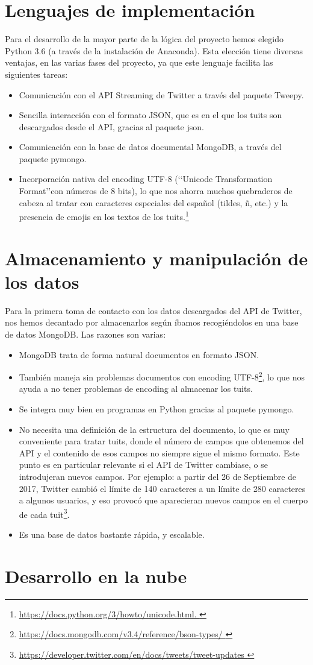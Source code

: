 \section{Lenguajes de implementación}

Para el desarrollo de la mayor parte de la lógica del proyecto hemos elegido Python 3.6 (a través de la
instalación de Anaconda). Esta elección tiene diversas ventajas, en las varias fases del proyecto, ya
que este lenguaje facilita las siguientes tareas:
\begin{itemize}
\item Comunicación con el API Streaming de Twitter a través del paquete Tweepy.
\item Sencilla interacción con el formato JSON, que es en el que los tuits son descargados desde el API, gracias al paquete json.
\item  Comunicación con la base de datos documental MongoDB, a través del paquete pymongo.
\item Incorporación nativa del encoding UTF-8 (\lq\lq Unicode Transformation Format\rq\rq con números de 8 bits), 
lo que nos ahorra muchos quebraderos de cabeza al tratar con caracteres especiales del español (tildes, ñ, etc.)
y la presencia de emojis en los textos de los tuits.\footnote{\url{https://docs.python.org/3/howto/unicode.html. }}
\end{itemize}


\section{Almacenamiento y manipulación de los datos}
Para la primera toma de contacto con los datos descargados del API de Twitter, nos hemos decantado por almacenarlos según íbamos recogiéndolos en una base de datos MongoDB. Las razones son varias:
\begin{itemize}
\item MongoDB trata de forma natural documentos en formato JSON.
\item También maneja sin problemas documentos con encoding UTF-8\footnote{
\url{https://docs.mongodb.com/v3.4/reference/bson-types/ }}, lo que nos ayuda a no tener problemas de encoding al
almacenar los tuits.
\item Se integra muy bien en programas en Python gracias al paquete pymongo.
\item No necesita una definición de la estructura del documento, lo que es muy conveniente
para tratar tuits, donde el número de campos que obtenemos del API y el contenido de esos campos no siempre
sigue el mismo formato. Este punto es en particular relevante si el API de Twitter cambiase, o se introdujeran nuevos 
campos. Por ejemplo: a partir del 26 de Septiembre de 2017,  Twitter cambió el límite de 140 caracteres
a un límite de 280 caracteres a algunos usuarios, y eso provocó que aparecieran nuevos campos en el cuerpo de cada
tuit\footnote{\url{https://developer.twitter.com/en/docs/tweets/tweet-updates }}.
\item Es una base de datos bastante rápida, y escalable.
\end{itemize}

\section{Desarrollo en la nube}